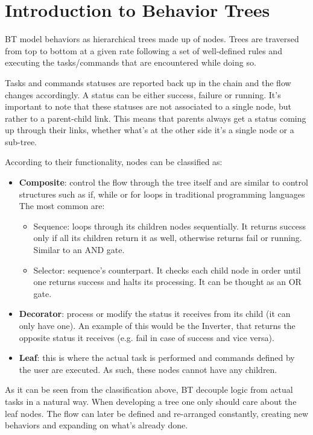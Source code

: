 \documentclass[a4paper,12pt]{article}
\begin{document}
\clearpage
\section{Introduction to Behavior Trees}
\label{sec:behavior-trees-introduction}

\ac{BT} model behaviors as hierarchical trees made up of nodes. Trees are traversed from top to bottom at a given rate following a set of well-defined rules and executing the tasks/commands that are encountered while doing so.

Tasks and commands statuses are reported back up in the chain and the flow changes accordingly. A status can be either success, failure or running. It's important to note that these statuses are not associated to a single node, but rather to a parent-child link. This means that parents always get a status coming up through their links, whether what's at the other side it's a single node or a sub-tree. 

According to their functionality, nodes can be classified as:

\begin{itemize}
\item \textbf{Composite}: control the flow through the tree itself and are similar to control structures such as if, while or for loops in traditional programming languages  The most common are:
\begin{itemize}
\item Sequence: loops through its children nodes sequentially. It returns success only if all its children return it as well, otherwise returns fail or running. Similar to an AND gate.
\item Selector: sequence's counterpart. It checks each child node in order until one returns success and halts its processing. It can be thought as an OR gate.
\end{itemize}
\item \textbf{Decorator}: process or modify the status it receives from its child (it can only have one). An example of this would be the Inverter, that returns the opposite status it receives (e.g. fail in case of success and vice versa).
\item \textbf{Leaf}: this is where the actual task is performed and commands defined by the user are executed. As such, these nodes cannot have any children.
\end{itemize}

As it can be seen from the classification above, \ac{BT} decouple logic from actual tasks in a natural way. When developing a tree one only should care about the leaf nodes. The flow can later be defined and re-arranged constantly, creating new behaviors and expanding on what's already done.
\end{document}
